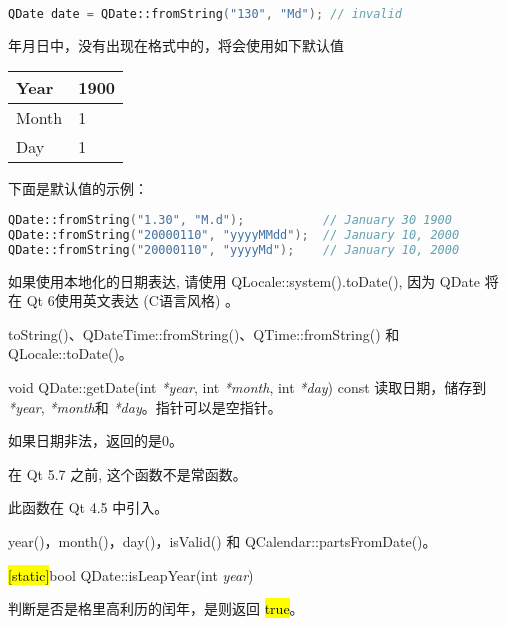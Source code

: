 \begin{lstlisting}[language=C++]
QDate date = QDate::fromString("130", "Md"); // invalid
\end{lstlisting}

年月日中，没有出现在格式中的，将会使用如下默认值

\begin{tabular}{|l|l|}
\hline
Year&	1900\\
\hline
Month&	1\\
\hline
Day&	1\\
\hline
\end{tabular}

下面是默认值的示例：

\begin{lstlisting}[language=C++]
QDate::fromString("1.30", "M.d");           // January 30 1900
QDate::fromString("20000110", "yyyyMMdd");  // January 10, 2000
QDate::fromString("20000110", "yyyyMd");    // January 10, 2000
\end{lstlisting}



\begin{notice}
如果使用本地化的日期表达, 请使用 QLocale::system().toDate(), 因为 QDate 将在 Qt 6使用英文表达 (C语言风格) 。
\end{notice}


\begin{seeAlso}
toString()、QDateTime::fromString()、QTime::fromString() 和 QLocale::toDate()。
\end{seeAlso}


\splitLine

void QDate::getDate(int  \emph{*year}, int \emph{*month}, int \emph{*day}) const
读取日期，储存到 \emph{*year},  \emph{*month}和 \emph{*day}。指针可以是空指针。

如果日期非法，返回的是0。

\begin{notice}
 在 Qt 5.7 之前, 这个函数不是常函数。
\end{notice}

此函数在 Qt 4.5 中引入。

\begin{seeAlso}
year()，month()，day()，isValid() 和
QCalendar::partsFromDate()。
\end{seeAlso}

\splitLine

\hl{[static]}bool QDate::isLeapYear(int \emph{year})

判断是否是格里高利历的闰年，是则返回 \hl{true}。

